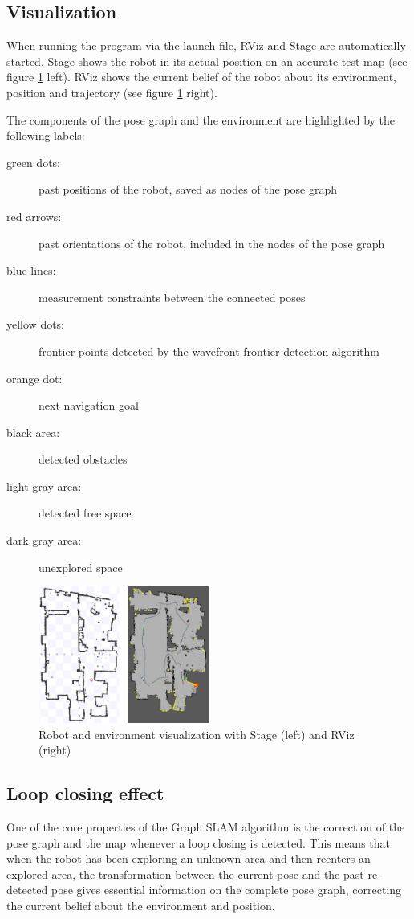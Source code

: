 \documentclass{ba-kecs}
\begin{document}
\subsection{Visualization}
When running the program via the launch file, RViz and Stage are automatically started. Stage shows the robot in its actual position on an accurate test map (see figure \ref{fig:stage_and_rviz} left). RViz shows the current belief of the robot about its environment, position and trajectory (see figure \ref{fig:stage_and_rviz} right).

The components of the pose graph and the environment are highlighted by the following labels:

\begin{description}
\item[green dots: ]past positions of the robot, saved as nodes of the pose graph
\item[red arrows: ]past orientations of the robot, included in the nodes of the pose graph
\item[blue lines: ]measurement constraints between the connected poses
\item[yellow dots: ]frontier points detected by the wavefront frontier detection algorithm
\item[orange dot: ] next navigation goal
\item[black area: ] detected obstacles
\item[light gray area: ] detected free space
\item[dark gray area: ] unexplored space
\end{description}

\begin{figure}[htbp]
	\centering
		\includegraphics[width=0.50\textwidth]{figures/Stage_and_rviz.jpg}
	\caption{Robot and environment visualization with Stage (left) and RViz (right)}
	\label{fig:stage_and_rviz}
\end{figure}

\subsection{Loop closing effect}
One of the core properties of the Graph SLAM algorithm is the correction of the pose graph and the map whenever a loop closing is detected. This means that when the robot has been exploring an unknown area and then reenters an explored area, the transformation between the current pose and the past re-detected pose gives essential information on the complete pose graph, correcting the current belief about the environment and position.
\end{document}
